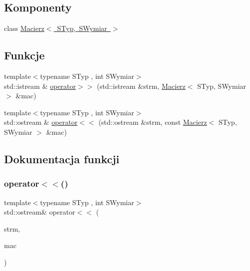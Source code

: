 \subsection*{Komponenty}
\begin{DoxyCompactItemize}
\item 
class \mbox{\hyperlink{class_macierz}{Macierz$<$ S\+Typ, S\+Wymiar $>$}}
\end{DoxyCompactItemize}
\subsection*{Funkcje}
\begin{DoxyCompactItemize}
\item 
{\footnotesize template$<$typename S\+Typ , int S\+Wymiar$>$ }\\std\+::istream \& \mbox{\hyperlink{macierz_8hh_aabf1de685c3323b984350caf2f6561c4}{operator$>$$>$}} (std\+::istream \&strm, \mbox{\hyperlink{class_macierz}{Macierz}}$<$ S\+Typ, S\+Wymiar $>$ \&mac)
\item 
{\footnotesize template$<$typename S\+Typ , int S\+Wymiar$>$ }\\std\+::ostream \& \mbox{\hyperlink{macierz_8hh_aeff8f9c12924cd393d9348ec4fce7afa}{operator$<$$<$}} (std\+::ostream \&strm, const \mbox{\hyperlink{class_macierz}{Macierz}}$<$ S\+Typ, S\+Wymiar $>$ \&mac)
\end{DoxyCompactItemize}


\subsection{Dokumentacja funkcji}
\mbox{\label{macierz_8hh_aeff8f9c12924cd393d9348ec4fce7afa}} 
\subsubsection{\texorpdfstring{operator$<$$<$()}{operator<<()}}
{\footnotesize\ttfamily template$<$typename S\+Typ , int S\+Wymiar$>$ \\
std\+::ostream\& operator$<$$<$ (\begin{DoxyParamCaption}\item[{std\+::ostream \&}]{strm,  }\item[{const \mbox{\hyperlink{class_macierz}{Macierz}}$<$ S\+Typ, S\+Wymiar $>$ \&}]{mac }\end{DoxyParamCaption})}

